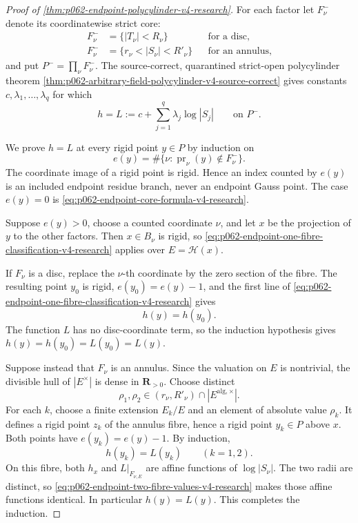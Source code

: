 \begin{proof}[Proof of \cref{thm:p062-endpoint-polycylinder-v4-research}]
For each factor let \(F_\nu^-\) denote its coordinatewise strict core:
\[
\begin{aligned}
 F_\nu^-&=\{|T_\nu|<R_\nu\}
              &&\text{for a disc},\\
 F_\nu^-&=\{r_\nu<|S_\nu|<R'_\nu\}
              &&\text{for an annulus},
\end{aligned}
\]
and put \(P^-=\prod_\nu F_\nu^-\).  The source-correct, quarantined strict-open
polycylinder theorem
\cref{thm:p062-arbitrary-field-polycylinder-v4-source-correct} gives constants
\(c,\lambda_1,\ldots,\lambda_q\) for which
\begin{equation}\label{eq:p062-endpoint-core-formula-v4-research}
             h=L:=c+\sum_{j=1}^q\lambda_j\log|S_j|
             \qquad\text{on }P^-.
\end{equation}

We prove \(h=L\) at every rigid point \(y\in P\) by induction on
\[
 e(y)=\#\{\nu:\operatorname{pr}_\nu(y)\notin F_\nu^-\}.
\]
The coordinate image of a rigid point is rigid.  Hence an index counted by
\(e(y)\) is an included endpoint residue branch, never an endpoint Gauss
point.  The case \(e(y)=0\) is
\eqref{eq:p062-endpoint-core-formula-v4-research}.

Suppose \(e(y)>0\), choose a counted coordinate \(\nu\), and let \(x\) be
the projection of \(y\) to the other factors.  Then \(x\in B_\nu\) is
rigid, so \eqref{eq:p062-endpoint-one-fibre-classification-v4-research}
applies over \(E=\mathscr H(x)\).

If \(F_\nu\) is a disc, replace the \(\nu\)-th coordinate by the zero
section of the fibre.  The resulting point \(y_0\) is rigid,
\(e(y_0)=e(y)-1\), and the first line of
\eqref{eq:p062-endpoint-one-fibre-classification-v4-research} gives
\[
                              h(y)=h(y_0).
\]
The function \(L\) has no disc-coordinate term, so the induction hypothesis
gives
\(
 h(y)=h(y_0)=L(y_0)=L(y)
\).

Suppose instead that \(F_\nu\) is an annulus.  Since the valuation on \(E\)
is nontrivial, the divisible hull of \(|E^\times|\) is dense in
\(\mathbf R_{>0}\).  Choose distinct
\[
       \rho_1,\rho_2\in(r_\nu,R'_\nu)
          \cap |E^{\mathrm{alg},\times}|.
\]
For each \(k\), choose a finite extension \(E_k/E\) and an element of
absolute value \(\rho_k\).  It defines a rigid point \(z_k\) of the annulus
fibre, hence a rigid point \(y_k\in P\) above \(x\).  Both points have
\(e(y_k)=e(y)-1\).  By induction,
\begin{equation}\label{eq:p062-endpoint-two-fibre-values-v4-research}
                         h(y_k)=L(y_k)\qquad(k=1,2).
\end{equation}
On this fibre, both \(h_x\) and \(L|_{F_{\nu,E}}\) are affine functions of
\(\log|S_\nu|\).  The two radii are distinct, so
\eqref{eq:p062-endpoint-two-fibre-values-v4-research} makes those affine
functions identical.  In particular \(h(y)=L(y)\).  This completes the
induction.


\end{proof}
